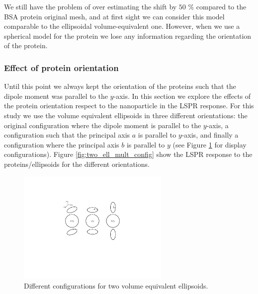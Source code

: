 We still have the problem of over estimating the shift by $50$ $\%$ compared to the BSA protein original mesh, 
and at first sight we can consider this model comparable to the ellipsoidal volume-equivalent one. However, 
when we use a spherical model for the protein we lose any information regarding the orientation of the protein. 


 \subsubsection{Effect of protein orientation}

 Until this point we always kept the orientation of the proteins such that the dipole moment was parallel to the $y$-axis. In this 
 section we explore the effects of the protein orientation respect to the nanoparticle in the LSPR response. For this study we use the 
 volume equivalent ellipsoids in three different orientations: the original configuration where the dipole moment is parallel to 
 the $y$-axis, a configuration such that the principal axis $a$ is parallel to $y$-axis, 
 and finally a configuration where the principal axis $b$ is parallel to $y$ (see Figure \ref{fig:two_ve_conf_display} for display configurations). Figure \ref{fig:two_ell_mult_config}
 show the LSPR response to the proteins/ellipsoids for the different orientations. 
 
 
 \begin{figure} %
    \centering
    \includegraphics[width=0.65\textwidth]{viz/two_ve_conf_display.pdf} 
    \caption{Different configurations for two volume equivalent ellipsoids.}
    \label{fig:two_ve_conf_display}
 \end{figure}


